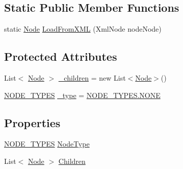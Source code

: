 \subsection*{Static Public Member Functions}
\begin{DoxyCompactItemize}
\item 
static \hyperlink{class_web_analyzer_1_1_models_1_1_settings_model_1_1_expression_tree_1_1_node}{Node} \hyperlink{class_web_analyzer_1_1_models_1_1_settings_model_1_1_expression_tree_1_1_node_a54323c9080efce8ccaac711e191edeec}{Load\+From\+X\+M\+L} (Xml\+Node node\+Node)
\end{DoxyCompactItemize}
\subsection*{Protected Attributes}
\begin{DoxyCompactItemize}
\item 
List$<$ \hyperlink{class_web_analyzer_1_1_models_1_1_settings_model_1_1_expression_tree_1_1_node}{Node} $>$ \hyperlink{class_web_analyzer_1_1_models_1_1_settings_model_1_1_expression_tree_1_1_node_a08c9f3e82b0a8baeac2db82f16266c60}{\+\_\+children} = new List$<$\hyperlink{class_web_analyzer_1_1_models_1_1_settings_model_1_1_expression_tree_1_1_node}{Node}$>$()
\item 
\hyperlink{class_web_analyzer_1_1_models_1_1_settings_model_1_1_expression_tree_1_1_node_a89c72b19ff778cbc04788f4cb47a730e}{N\+O\+D\+E\+\_\+\+T\+Y\+P\+E\+S} \hyperlink{class_web_analyzer_1_1_models_1_1_settings_model_1_1_expression_tree_1_1_node_ad944bafbeb7287e38bc6bc7826752516}{\+\_\+type} = \hyperlink{class_web_analyzer_1_1_models_1_1_settings_model_1_1_expression_tree_1_1_node_a89c72b19ff778cbc04788f4cb47a730eab50339a10e1de285ac99d4c3990b8693}{N\+O\+D\+E\+\_\+\+T\+Y\+P\+E\+S.\+N\+O\+N\+E}
\end{DoxyCompactItemize}
\subsection*{Properties}
\begin{DoxyCompactItemize}
\item 
\hyperlink{class_web_analyzer_1_1_models_1_1_settings_model_1_1_expression_tree_1_1_node_a89c72b19ff778cbc04788f4cb47a730e}{N\+O\+D\+E\+\_\+\+T\+Y\+P\+E\+S} \hyperlink{class_web_analyzer_1_1_models_1_1_settings_model_1_1_expression_tree_1_1_node_a326bab10d73a525224fcf5b061491dda}{Node\+Type}
\item 
List$<$ \hyperlink{class_web_analyzer_1_1_models_1_1_settings_model_1_1_expression_tree_1_1_node}{Node} $>$ \hyperlink{class_web_analyzer_1_1_models_1_1_settings_model_1_1_expression_tree_1_1_node_af97835cf31c19c83f0044bbd6f4a9e91}{Children}
\end{DoxyCompactItemize}
